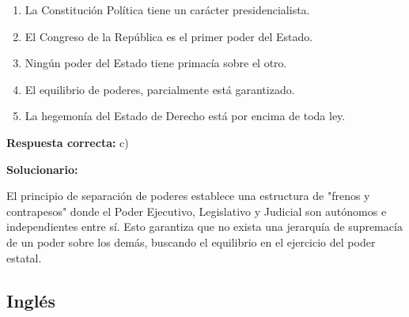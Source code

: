 \begin{enumerate}[resume]
	\begin{enumerate}[label=\alph*)]
		\item La Constitución Política tiene un carácter presidencialista.
		\item El Congreso de la República es el primer poder del Estado.
		\item Ningún poder del Estado tiene primacía sobre el otro.
		\item El equilibrio de poderes, parcialmente está garantizado.
		\item La hegemonía del Estado de Derecho está por encima de toda ley.
	\end{enumerate}

	\textbf{Respuesta correcta:} c)

	\vspace{2mm}
	\textbf{Solucionario:}

	El principio de separación de poderes establece una estructura de "frenos y contrapesos" donde el Poder Ejecutivo, Legislativo y Judicial son autónomos e independientes entre sí. Esto garantiza que no exista una jerarquía de supremacía de un poder sobre los demás, buscando el equilibrio en el ejercicio del poder estatal.



	\vspace{6mm}



	\vspace{6mm}

\end{enumerate}




\subsection*{Inglés}


